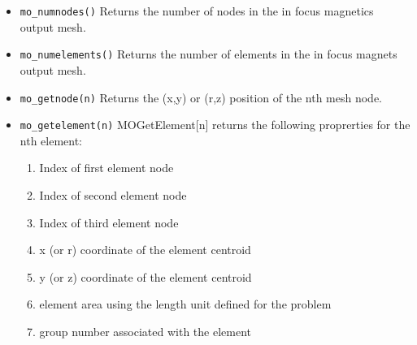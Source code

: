 \begin{itemize}
\item{\tt mo\_numnodes()} Returns the number of nodes in the in focus magnetics output mesh.
\item{\tt mo\_numelements()} Returns the number of elements in the in focus magnets output mesh.
\item{\tt mo\_getnode(n)} Returns the (x,y) or (r,z) position of the nth mesh node.
\item{\tt mo\_getelement(n)} MOGetElement[n] returns the following proprerties for the nth element:
    \begin{enumerate}
        \item Index of first element node
        \item Index of second element node
        \item Index of third element node
        \item x (or r) coordinate of the element centroid
        \item y (or z) coordinate of the element centroid
        \item element area using the length unit defined for the problem
        \item group number associated with the element
    \end{enumerate}

\end{itemize}
